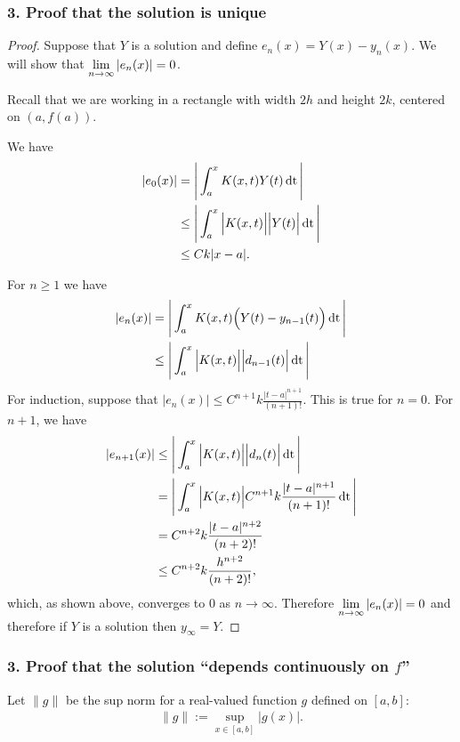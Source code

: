 \documentclass[12pt]{article}
\begin{document}
\subsubsection*{3. Proof that the solution is unique}

\begin{proof}
Suppose that $Y$ is a solution and define $e_n(x) = Y(x) - y_n(x)$. We will
show that $\lim\limits_{n \to \infty} |e_n(x)| = 0$.

Recall that we are working in a rectangle with width $2h$ and height $2k$,
centered on $(a, f(a))$.

We have
\begin{align*}
  |e_0(x)| &=    \Bigg|\int_a^x K(x,t)Y(t) \operatorname{\text{dt}}\Bigg|\\
           &\leq \Bigg|\int_a^x \Big|K(x,t)\Big|\Big|Y(t)\Big| \operatorname{\text{dt}}\Bigg|\\
           &\leq Ck|x-a|.
\end{align*}

For $n \geq 1$ we have
\begin{align*}
  |e_n(x)| &= \Bigg|\int_a^x K(x,t)\Big(Y(t) - y_{n-1}(t)\Big) \operatorname{\text{dt}}\Bigg|\\
           &\leq \Bigg|\int_a^x \Big|K(x,t)\Big|\Big|d_{n-1}(t)\Big|\operatorname{\text{dt}}\Bigg|\\
\end{align*}
For induction, suppose that $|e_n(x)| \leq
C^{n+1}k\frac{|t-a|^{n+1}}{(n+1)!}$. This is true for $n=0$. For $n+1$, we have
\begin{align*}
|e_{n+1}(x)| &\leq \Bigg|\int_a^x \Big|K(x,t)\Big|\Big|d_{n}(t)\Big|\operatorname{\text{dt}}\Bigg|\\
            &=    \Bigg|\int_a^x \Big|K(x,t)\Big|C^{n+1}k\frac{|t-a|^{n+1}}{(n+1)!}\operatorname{\text{dt}}\Bigg|\\
            &=    C^{n+2}k\frac{|t-a|^{n+2}}{(n+2)!}\\
            &\leq C^{n+2}k\frac{h^{n+2}}{(n+2)!},
\end{align*}
which, as shown above, converges to 0 as $n \to \infty$. Therefore
$\lim\limits_{n \to \infty} |e_n(x)| = 0$ and therefore if $Y$ is a solution then $y_\infty = Y$.
\end{proof}

\newpage
\subsubsection*{3. Proof that the solution ``depends continuously on $f$''}

Let $\|g\|$ be the sup norm for a real-valued function $g$ defined on $[a,b]$:
\begin{align*}
  \|g\| := \sup_{x\in [a,b]} \Big|g(x)\Big|.
\end{align*}
\end{document}
